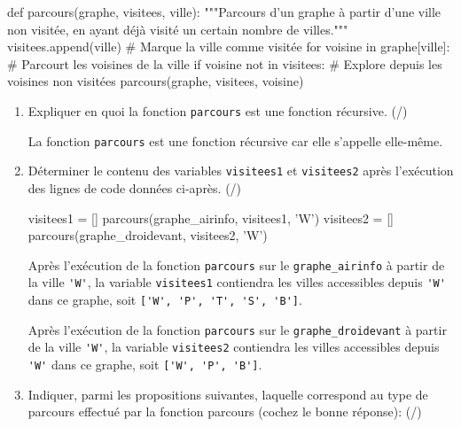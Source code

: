 \begin{CodePythontexAlt}[TaillePolice=\large, Largeur=1\linewidth,Centre,Lignes=true,PremLigne=1]{}
def parcours(graphe, visitees, ville):
    """Parcours d'un graphe à partir d'une ville non visitée, 
    en ayant déjà visité un certain nombre de villes."""
    visitees.append(ville)              # Marque la ville comme visitée
    for voisine in graphe[ville]:       # Parcourt les voisines de la ville
        if voisine not in visitees:
            # Explore depuis les voisines non visitées
            parcours(graphe, visitees, voisine)  
\end{CodePythontexAlt}

\pagebreak

\begin{enumerate}[resume=monDS]
\item  Expliquer en quoi la fonction \texttt{parcours} est une fonction récursive. (/)
\begin{blocvisible}[height=1.5]
    La fonction \texttt{parcours} est une fonction récursive car elle s'appelle elle-même. 
\end{blocvisible}

\medskip

\item Déterminer le contenu des variables \texttt{visitees1} et \texttt{visitees2} après l'exécution des lignes de code données ci-après. (/)

\begin{CodePythontexAlt}[TaillePolice=\large, Largeur=1\linewidth,Centre,Lignes=true,PremLigne=1]{}
visitees1 = []
parcours(graphe_airinfo, visitees1, 'W')
visitees2 = []
parcours(graphe_droidevant, visitees2, 'W')
\end{CodePythontexAlt}

\begin{blocvisible}[height=3]
    Après l'exécution de la fonction \texttt{parcours} sur le \texttt{graphe\_airinfo} à partir de la ville \verb|'W'|, la variable \texttt{visitees1} contiendra les villes accessibles depuis \verb|'W'| dans ce graphe, soit \verb|['W', 'P', 'T', 'S', 'B']|.

    Après l'exécution de la fonction \texttt{parcours} sur le \texttt{graphe\_droidevant} à partir de la ville \verb|'W'|, la variable \texttt{visitees2} contiendra les villes accessibles depuis \verb|'W'| dans ce graphe, soit \verb|['W', 'P', 'B']|.
\end{blocvisible}

\medskip
\item Indiquer, parmi les propositions suivantes, laquelle correspond au type de parcours effectué par la fonction parcours (cochez le bonne réponse): (/)



\end{enumerate}
